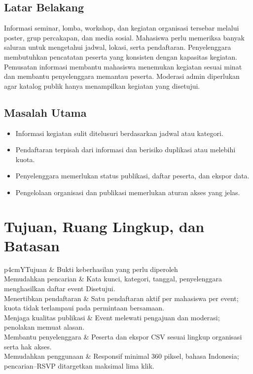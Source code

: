 \documentclass[11pt,a4paper]{article}
\newcommand{\tbl}[2]{\par\smallskip\noindent\begin{tabularx}{\linewidth}{#1}\toprule #2\bottomrule\end{tabularx}\par\smallskip}
\newcommand{\page}[1]{\clearpage\section{#1}}
\begin{document}
\subsection{Latar Belakang}
Informasi seminar, lomba, workshop, dan kegiatan organisasi tersebar melalui poster, grup percakapan, dan media sosial. Mahasiswa perlu memeriksa banyak saluran untuk mengetahui jadwal, lokasi, serta pendaftaran. Penyelenggara membutuhkan pencatatan peserta yang konsisten dengan kapasitas kegiatan.
Pemusatan informasi membantu mahasiswa menemukan kegiatan sesuai minat dan membantu penyelenggara memantau peserta. Moderasi admin diperlukan agar katalog publik hanya menampilkan kegiatan yang disetujui.
\subsection{Masalah Utama}
\begin{itemize}
\item Informasi kegiatan sulit ditelusuri berdasarkan jadwal atau kategori.
\item Pendaftaran terpisah dari informasi dan berisiko duplikasi atau melebihi kuota.
\item Penyelenggara memerlukan status publikasi, daftar peserta, dan ekspor data.
\item Pengelolaan organisasi dan publikasi memerlukan aturan akses yang jelas.
\end{itemize}
\page{Tujuan, Ruang Lingkup, dan Batasan}
\tbl{p{4cm}Y}{Tujuan & Bukti keberhasilan yang perlu diperoleh\\\midrule
Memudahkan pencarian & Kata kunci, kategori, tanggal, penyelenggara menghasilkan daftar event Disetujui.\\
Menertibkan pendaftaran & Satu pendaftaran aktif per mahasiswa per event; kuota tidak terlampaui pada permintaan bersamaan.\\
Menjaga kualitas publikasi & Event melewati pengajuan dan moderasi; penolakan memuat alasan.\\
Membantu penyelenggara & Peserta dan ekspor CSV sesuai lingkup organisasi serta hak akses.\\
Memudahkan penggunaan & Responsif minimal 360 piksel, bahasa Indonesia; pencarian--RSVP ditargetkan maksimal lima klik.\\}
\end{document}
